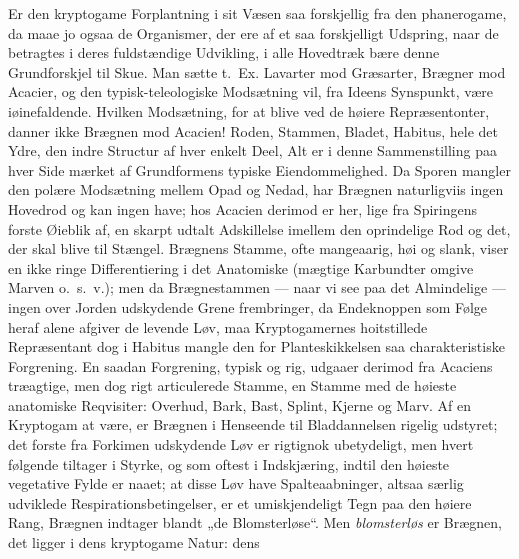 \documentclass[11pt]{book}
\newcommand{\opage}[1]{\marginnote{\footnotesize\textit{[#1]}}}
\begin{document}
Er den kryptogame Forplantning i sit Væsen saa forskjellig fra den
phanerogame, da maae jo ogsaa de Organismer, der ere af et saa forskjelligt
Udspring, naar de betragtes i deres fuldstændige Udvikling, i alle
Hovedtræk bære denne Grundforskjel til Skue. Man sætte t.~Ex. Lavarter mod
Græsarter, Brægner mod Acacier, og den typisk-teleologiske Modsætning vil,
fra Ideens Synspunkt, være iøinefaldende. Hvilken Modsætning, for at blive
ved de høiere Repræsentonter,
danner ikke Brægnen mod Acacien! Roden, Stammen, Bladet, Habitus, hele det
Ydre, den indre Structur af hver enkelt Deel, Alt er i denne Sammenstilling
paa hver Side mærket af Grundformens typiske Eiendommelighed. Da Sporen
mangler den polære Modsætning mellem Opad og Nedad, har Brægnen naturligviis
ingen Hovedrod og kan ingen have; hos Acacien derimod er her, lige fra
Spiringens forste Øieblik af,
en skarpt udtalt Adskillelse imellem den oprindelige Rod og det, der skal
blive til Stængel. Brægnens Stamme, ofte mangeaarig, høi og slank, viser en
ikke ringe Differentiering i det Anatomiske (mægtige Karbundter omgive
Marven
\opage{302} \setcounter{footnote}{0}%
o.~s.~v.); men da Brægnestammen --- naar vi see paa det Almindelige --- ingen
over Jorden udskydende Grene frembringer, da Endeknoppen som Følge heraf
alene afgiver de levende Løv, maa Kryptogamernes hoitstillede Repræsentant
dog i Habitus mangle den for Planteskikkelsen saa charakteristiske
Forgrening. En saadan Forgrening, typisk og rig, udgaaer derimod fra
Acaciens træagtige, men dog rigt articulerede Stamme, en Stamme med de
høieste anatomiske Reqvisiter: Overhud, Bark, Bast, Splint, Kjerne og Marv.
Af en Kryptogam at være, er Brægnen i Henseende til Bladdannelsen rigelig
udstyret; det forste fra Forkimen udskydende Løv er rigtignok ubetydeligt,
men hvert følgende tiltager i Styrke, og som oftest i Indskjæring, indtil
den høieste vegetative Fylde er naaet; at disse Løv have Spalteaabninger,
altsaa særlig udviklede Respirationsbetingelser, er et umiskjendeligt Tegn
paa den høiere Rang, Brægnen indtager blandt „de Blomsterløse“. Men
\emph{blomsterløs} er Brægnen, det ligger i dens kryptogame Natur: dens
\end{document}
